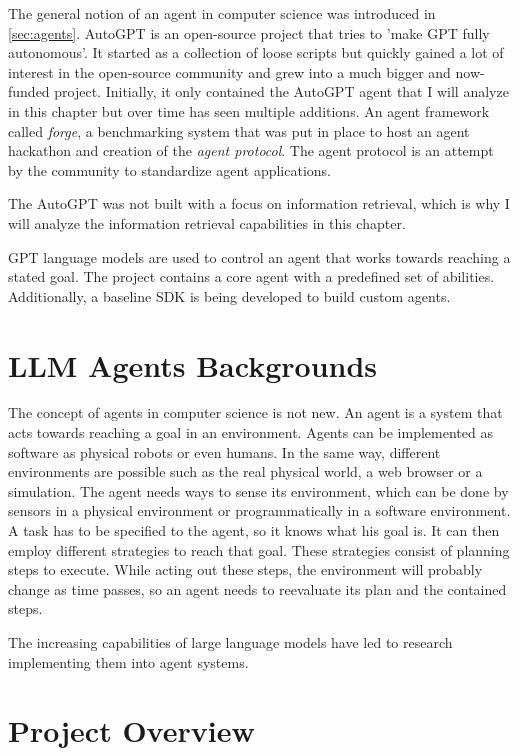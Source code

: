\documentclass[../main.tex]{subfiles}
\begin{document}
The general notion of an agent in computer science was introduced in \autoref{sec:agents}.
AutoGPT is an open-source project that tries to 'make GPT fully autonomous'.
It started as a collection of loose scripts but quickly gained a lot of interest in the open-source community and grew into a much bigger and now-funded project.
Initially, it only contained the AutoGPT agent that I will analyze in this chapter but over time has seen multiple additions.
An agent framework called \textit{forge}, a benchmarking system that was put in place to host an agent hackathon and creation of the \textit{agent protocol}.
The agent protocol is an attempt by the community to standardize agent applications.

The AutoGPT was not built with a focus on information retrieval,
which is why I will analyze the information retrieval capabilities in this chapter.

GPT language models are used to control an agent that works towards reaching a stated goal.
The project contains a core agent with a predefined set of abilities.
Additionally, a baseline SDK is being developed to build custom agents.

\section{LLM Agents Backgrounds}

The concept of agents in computer science is not new.
An agent is a system that acts towards reaching a goal in an environment.
Agents can be implemented as software as physical robots or even humans.
In the same way, different environments are possible such as the real physical world,
a web browser or a simulation.
The agent needs ways to sense its environment,
which can be done by sensors in a physical environment or programmatically in a software environment.
A task has to be specified to the agent,
so it knows what his goal is.
It can then employ different strategies to reach that goal.
These strategies consist of planning steps to execute.
While acting out these steps, the environment will probably change as time passes, so an agent needs to reevaluate its plan and the contained steps.

The increasing capabilities of large language models have led to research implementing them into agent systems.

\section{Project Overview}
\end{document}
